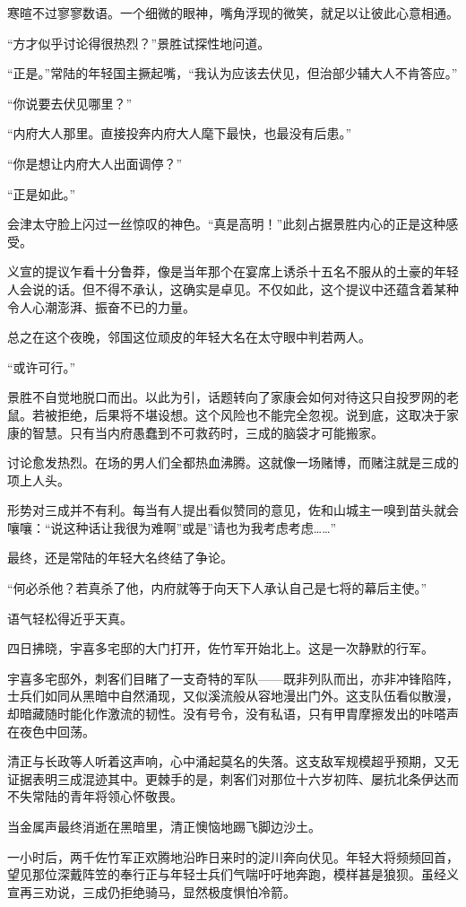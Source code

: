 \documentclass[
]{book}
\begin{document}
寒暄不过寥寥数语。一个细微的眼神，嘴角浮现的微笑，就足以让彼此心意相通。

``方才似乎讨论得很热烈？''景胜试探性地问道。

``正是。''常陆的年轻国主撅起嘴，``我认为应该去伏见，但治部少辅大人不肯答应。''

``你说要去伏见哪里？''

``内府大人那里。直接投奔内府大人麾下最快，也最没有后患。''

``你是想让内府大人出面调停？''

``正是如此。''

会津太守脸上闪过一丝惊叹的神色。``真是高明！''此刻占据景胜内心的正是这种感受。

义宣的提议乍看十分鲁莽，像是当年那个在宴席上诱杀十五名不服从的土豪的年轻人会说的话。但不得不承认，这确实是卓见。不仅如此，这个提议中还蕴含着某种令人心潮澎湃、振奋不已的力量。

总之在这个夜晚，邻国这位顽皮的年轻大名在太守眼中判若两人。

``或许可行。''

景胜不自觉地脱口而出。以此为引，话题转向了家康会如何对待这只自投罗网的老鼠。若被拒绝，后果将不堪设想。这个风险也不能完全忽视。说到底，这取决于家康的智慧。只有当内府愚蠢到不可救药时，三成的脑袋才可能搬家。

讨论愈发热烈。在场的男人们全都热血沸腾。这就像一场赌博，而赌注就是三成的项上人头。

形势对三成并不有利。每当有人提出看似赞同的意见，佐和山城主一嗅到苗头就会嚷嚷：``说这种话让我很为难啊''或是''请也为我考虑考虑\ldots\ldots''

最终，还是常陆的年轻大名终结了争论。

``何必杀他？若真杀了他，内府就等于向天下人承认自己是七将的幕后主使。''

语气轻松得近乎天真。

四日拂晓，宇喜多宅邸的大门打开，佐竹军开始北上。这是一次静默的行军。

宇喜多宅邸外，刺客们目睹了一支奇特的军队------既非列队而出，亦非冲锋陷阵，士兵们如同从黑暗中自然涌现，又似溪流般从容地漫出门外。这支队伍看似散漫，却暗藏随时能化作激流的韧性。没有号令，没有私语，只有甲胄摩擦发出的咔嗒声在夜色中回荡。

清正与长政等人听着这声响，心中涌起莫名的失落。这支敌军规模超乎预期，又无证据表明三成混迹其中。更棘手的是，刺客们对那位十六岁初阵、屡抗北条伊达而不失常陆的青年将领心怀敬畏。

当金属声最终消逝在黑暗里，清正懊恼地踢飞脚边沙土。

一小时后，两千佐竹军正欢腾地沿昨日来时的淀川奔向伏见。年轻大将频频回首，望见那位深戴阵笠的奉行正与年轻士兵们气喘吁吁地奔跑，模样甚是狼狈。虽经义宣再三劝说，三成仍拒绝骑马，显然极度惧怕冷箭。
\end{document}
